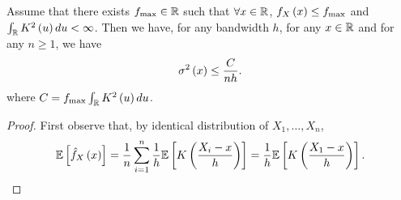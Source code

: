 \begin{proposition}\label{prop:1}
  Assume that there exists $f_{\max}\in \mathbb{R}$ such that $\forall x\in \mathbb{R}$, $f_X\left(x\right)\leq f_{\max}$ and $\int_{\mathbb{R}} K^2\left(u\right)du <\infty$. Then we have, for any bandwidth $h$, for any $x\in \mathbb{R}$ and for any $n\ge 1$, we have
  \begin{equation*}
    \sigma^2\left(x\right)\leq \frac{C}{nh}.
  \end{equation*}
  where $C= f_{\max}\int_{\mathbb{R}} K^2\left(u\right)du$.
\end{proposition}
\begin{proof}
  First observe that, by identical distribution of $X_1,\ldots, X_n$,
  \begin{equation}\label{eq:expectation}
    \mathbb{E}\left[\hat{f}_X\left(x\right)\right] = \frac{1}{n}\sum_{i=1}^n \frac{1}{h}\mathbb{E}\left[K\left(\frac{X_i-x}{h}\right)\right] = \frac{1}{h}\mathbb{E}\left[K\left(\frac{X_1-x}{h}\right)\right].
  \end{equation}


\end{proof}

